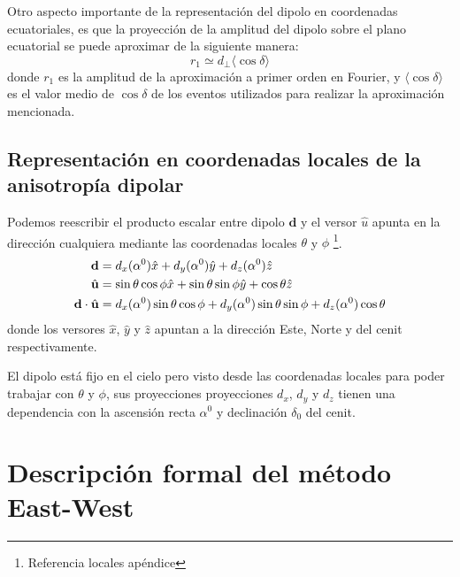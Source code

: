 Otro aspecto importante de la representación del dipolo en coordenadas ecuatoriales, es que la proyección de la amplitud del dipolo sobre el plano ecuatorial se puede aproximar de la siguiente manera:
\begin{equation}
    r_1 \simeq d_\perp \langle \cos\delta \rangle
    \label{eq:fourier_perp}
\end{equation}
donde $r_1$ es la amplitud de la aproximación a primer orden en Fourier, y $\langle \cos\delta \rangle$ es el valor medio de $\cos\delta $ de los eventos utilizados para realizar la aproximación mencionada.

\subsection{Representación en coordenadas locales de la anisotropía dipolar}
Podemos reescribir el producto escalar entre dipolo $\textbf{d}$ y el versor $\hat{u}$ apunta en la dirección cualquiera mediante las coordenadas locales $\theta$ y $\phi$ \footnote{Referencia locales apéndice}.
\begin{align}
    \textbf{d} &=  d_x(\alpha^0)\hat{x} +  d_y(\alpha^0)\hat{y}+ d_z(\alpha^0)\hat{z} \\
    \hat{\bf{u}} &=\sin\theta \cos\phi \hat{x} + \sin\theta \sin\phi \hat{y} + \cos\theta\hat{z}\\
    \textbf{d}\cdot\hat{\bf{u}} &= d_x(\alpha^0)\sin\theta \cos\phi
    + d_y(\alpha^0) \sin\theta \sin\phi  
     + d_z(\alpha^0)\cos\theta \label{eq:dot-prod-local}
\end{align}
donde los versores $\hat{x}$, $\hat{y}$ y $\hat{z}$ apuntan a la dirección Este, Norte  y  del cenit respectivamente. 

El dipolo está fijo en el cielo pero visto desde las coordenadas locales para poder trabajar con $\theta$ y $\phi$, sus proyecciones  proyecciones $d_x$, $d_y$ y $d_z$  tienen una dependencia con la ascensión recta  $\alpha^0$ y declinación $\delta_0$ del cenit. 

\section{Descripción formal del método East-West}

